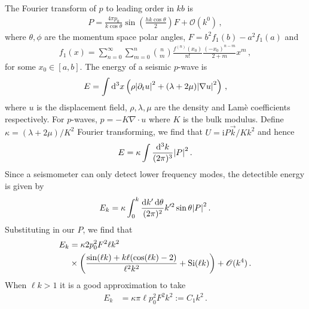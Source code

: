 \documentclass[prd,reprint,10pt,tightenlines]{revtex4-1}
\newcommand*\diff{\mathop{}\!\mathrm{d}}
\newcommand*\scr[1]{\mathscr{#1}}
\newcommand*\te[1]{\text{#1}}
\newcommand*\p[1]{\left(#1\right)}
\newcommand*\f[2]{\frac{#1}{#2}}
\newcommand*\I{\te{i}}
\begin{document}
The Fourier transform of $p$ to leading order in $kb$ is
\begin{align}
P = \f{4\pi p_0}{k\cos\theta}\sin\p{\f{h k\cos\theta}{2}}F+\scr O(k^0)\,,
\end{align}
where $\theta,\phi$ are the momentum space polar angles, $F = b^2f_1(b)-a^2f_1(a)$ and
\begin{align}
f_1(x) = \sum_{n=0}^\infty\sum_{m=0}^n\binom{n}{m}\f{f^{(n)}(x_0)}{n!}\f{(-x_0)^{n-m}}{2+m}x^{m}\,,
\end{align}
for some $x_0\in[a,b]$. The energy of a seismic $p$-wave is
\begin{align}
E = \int\diff^3 x\p{ \rho\abs{\partial_t u}^2+(\lambda+2\mu)\abs{\nabla u}^2}\,,
\end{align}
where $u$ is the displacement field, $\rho,\lambda,\mu$ are the density and Lam\`e coefficients respectively. For $p$-waves, $p = -K\nabla\cdot u$ where $K$ is the bulk modulus. Define $\kappa = (\lambda + 2\mu)/K^2$ Fourier transforming, we find that $U = \I P\vec k/K k^2$ and hence
\begin{align}
E =\kappa\int\f{\diff^3 k}{(2\pi)^3}\abs{P}^2\,.
\end{align}
Since a seismometer can only detect lower frequency modes, the detectible energy is given by 
\begin{align}
E_k = \kappa\int_0^k\f{\diff k'\diff\theta}{(2\pi)^2}k'^2\sin\theta\abs{P}^2\,.
\end{align}
Substituting in our $P$, we find that
\begin{align}
\notag E_k&=\kappa 2p_0^2F^2\ell k^2\\\notag&\times\p{\f{\sin(\ell k)+k\ell(\cos(\ell k)-2)}{\ell^2 k^2}+\te{Si}(\ell k)}+\scr O(k^4)\,.
\end{align}
When $\ell k>1$ it is a good approximation to take
\begin{align}
E_k&=\kappa \pi\ell p_0^2F^2 k^2:=C_1 k^2\,.
\end{align}
\end{document}
